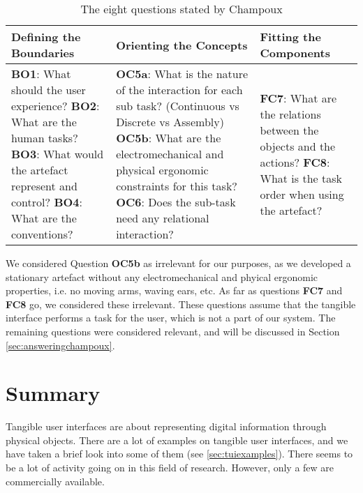 \begin{table}[h]
	\begin{tabular}{| p{5.0cm} | p{5.0cm} | p{5.0cm} |}
	\hline
	\textbf{Defining the Boundaries} & \textbf{Orienting the Concepts} & \textbf{Fitting the Components} \\
	\hline
	\textbf{BO1}: What should the user experience? \newline
	\textbf{BO2}: What are the human tasks? \newline
	\textbf{BO3}: What would the artefact represent and control? \newline 
	\textbf{BO4}: What are the conventions? \newline 
	&
	\textbf{OC5a}: What is the nature of the interaction for each sub task? (Continuous vs Discrete vs Assembly) \newline
	\textbf{OC5b}: What are the electromechanical and physical ergonomic constraints for this task? \newline
	\textbf{OC6}: Does the sub-task need any relational interaction? \newline
	&
	\textbf{FC7}: What are the relations between the objects and the actions? \newline 
	\textbf{FC8}: What is the task order when using the artefact? \\ 
	\hline
	
	\end{tabular}
	\caption{The eight questions stated by Champoux\cite{champoux2007design}}
	\label{tab:tuidesign}
\end{table}  

We considered Question \textbf{OC5b} as irrelevant for our purposes, as we developed a stationary artefact without any electromechanical and phyical ergonomic properties, i.e. no moving arms, waving ears, etc. As far as questions \textbf{FC7} and \textbf{FC8} go, we considered these irrelevant. These questions assume that the tangible interface performs a task for the user, which is not a part of our system. The remaining questions were considered relevant, and will be discussed in Section \ref{sec:answeringchampoux}.     



\section{Summary}
\label{sec:tangiblesummary}
Tangible user interfaces are about representing digital information through physical objects. There are a lot of examples on tangible user interfaces, and we have taken a brief look into some of them (see \ref{sec:tuiexamples}). There seems to be a lot of activity going on in this field of research. However, only a few are commercially available. 

